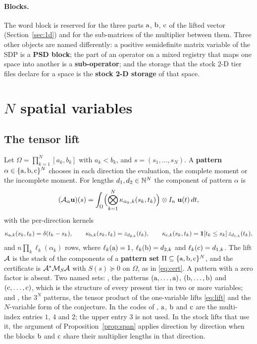 \paragraph{Blocks.} The word block is reserved for the three parts $\mathrm{a}$, $\mathrm{b}$, $\mathrm{c}$ of the lifted vector (Section~\ref{sec:1d}) and for the sub-matrices of the multiplier between them. Three other objects are named differently: a positive semidefinite matrix variable of the SDP is a \textbf{PSD block}; the part of an operator on a mixed registry that maps one space into another is a \textbf{sub-operator}; and the storage that the stock 2-D tier files declare for a space is the \textbf{stock 2-D storage} of that space.

\section{$N$ spatial variables}\label{sec:nd}

\subsection{The tensor lift}\label{sec:tensor}

Let $\Omega=\prod_{k=1}^N[a_k,b_k]$ with $a_k<b_k$, and $s=(s_1,\dots,s_N)$. A \textbf{pattern} $\alpha\in\{\mathrm{a},\mathrm{b},\mathrm{c}\}^N$ chooses in each direction the evaluation, the complete moment or the incomplete moment. For lengths $d_1,d_2\in\mathbb{N}^N$ the component of pattern $\alpha$ is
\begin{equation}\label{eq:comp}
(\mathcal{A}_\alpha\mathbf{u})(s)=\int_\Omega\Bigl(\bigotimes_{k=1}^N\kappa_{\alpha_k,k}(s_k,t_k)\Bigr)\otimes I_n\;\mathbf{u}(t)\,dt,
\end{equation}
with the per-direction kernels
\[
\kappa_{\mathrm{a},k}(s_k,t_k)=\delta(t_k-s_k),\qquad \kappa_{\mathrm{b},k}(s_k,t_k)=z_{d_{2,k}}(t_k),\qquad \kappa_{\mathrm{c},k}(s_k,t_k)=\mathbf 1[t_k\le s_k]\,z_{d_{1,k}}(t_k),
\]
and $n\prod_k\ell_k(\alpha_k)$ rows, where $\ell_k(\mathrm{a})=1$, $\ell_k(\mathrm{b})=d_{2,k}$ and $\ell_k(\mathrm{c})=d_{1,k}$. The lift $\mathcal{A}$ is the stack of the components of a \textbf{pattern set} $\Pi\subseteq\{\mathrm{a},\mathrm{b},\mathrm{c}\}^N$, and the certificate is $\mathcal{A}^*\mathcal{M}_S\mathcal{A}$ with $S(s)\succeq0$ on $\Omega$, as in \eqref{eq:cert}. A pattern with a zero factor is absent. Two named sets: , the patterns $(\mathrm{a},\dots,\mathrm{a})$, $(\mathrm{b},\dots,\mathrm{b})$ and $(\mathrm{c},\dots,\mathrm{c})$, which is the structure of every present tier in two or more variables; and , the $3^N$ patterns, the tensor product of the one-variable lifts \eqref{eq:lift} and the $N$-variable form of the conjecture. In the codes of , $\mathrm{a}$, $\mathrm{b}$ and $\mathrm{c}$ are the multi-index entries $1$, $4$ and $2$; the upper entry $3$ is not used. In the stock lifts that use it, the argument of Proposition~\ref{prop:span} applies direction by direction when the blocks $\mathrm{b}$ and $\mathrm{c}$ share their multiplier lengths in that direction.

